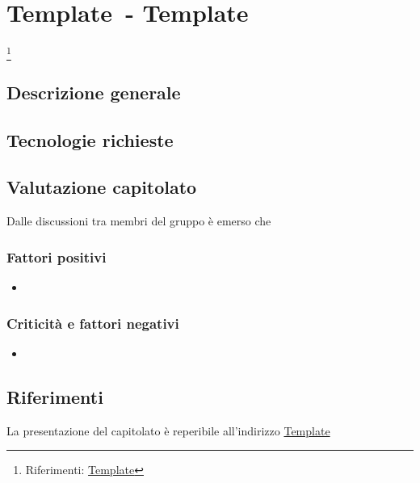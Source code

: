 
\renewcommand{\capName}{Template} %
\renewcommand{\capCode}{Template} %
\renewcommand{\capLink}{Template} %
\renewcommand{\capProposer}{Template} %


\section{\capCode\ - \capName} \footnote{Riferimenti: \url{\capLink}}
\subsection{Descrizione generale}

\subsection{Tecnologie richieste}

\subsection{Valutazione capitolato}
Dalle discussioni tra membri del gruppo è emerso che

\subsubsection{Fattori positivi}

\begin{itemize}
    \item 
\end{itemize}

\subsubsection{Criticità e fattori negativi}

\begin{itemize}
    \item 
\end{itemize}

\subsection{Riferimenti}
La presentazione del capitolato è reperibile all'indirizzo \url{\capLink}